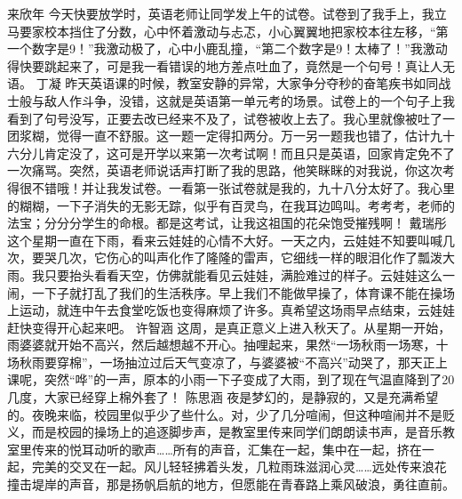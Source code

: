 {}\markdownRendererInterblockSeparator
{}来欣年\markdownRendererInterblockSeparator
{}今天快要放学时，英语老师让同学发上午的试卷。试卷到了我手上，我立马要家校本挡住了分数，心中怀着激动与忐忑，小心翼翼地把家校本往左移，“第一个数字是9！”我激动极了，心中小鹿乱撞，“第二个数字是9！太棒了！”我激动得快要跳起来了，可是我一看错误的地方差点吐血了，竟然是一个句号！真让人无语。\markdownRendererInterblockSeparator
{}\markdownRendererInterblockSeparator
{}丁凝\markdownRendererInterblockSeparator
{}昨天英语课的时候，教室安静的异常，大家争分夺秒的奋笔疾书如同战士般与敌人作斗争，没错，这就是英语第一单元考的场景。试卷上的一个句子上我看到了句号没写，正要去改已经来不及了，试卷被收上去了。我心里就像被吐了一团浆糊，觉得一直不舒服。这一题一定得扣两分。万一另一题我也错了，估计九十六分儿肯定没了，这可是开学以来第一次考试啊！而且只是英语，回家肯定免不了一次痛骂。突然，英语老师说话声打断了我的思路，他笑眯眯的对我说，你这次考得很不错哦！并让我发试卷。一看第一张试卷就是我的，九十八分太好了。我心里的糊糊，一下子消失的无影无踪，似乎有百灵鸟，在我耳边鸣叫。考考考，老师的法宝；分分分学生的命根。都是这考试，让我这祖国的花朵饱受摧残啊！\markdownRendererInterblockSeparator
{}\markdownRendererInterblockSeparator
{}戴瑞彤\markdownRendererInterblockSeparator
{}这个星期一直在下雨，看来云娃娃的心情不大好。一天之内，云娃娃不知要叫喊几次，要哭几次，它伤心的叫声化作了隆隆的雷声，它细线一样的眼泪化作了瓢泼大雨。我只要抬头看看天空，仿佛就能看见云娃娃，满脸难过的样子。云娃娃这么一闹，一下子就打乱了我们的生活秩序。早上我们不能做早操了，体育课不能在操场上运动，就连中午去食堂吃饭也变得麻烦了许多。真希望这场雨早点结束，云娃娃赶快变得开心起来吧。\markdownRendererInterblockSeparator
{}\markdownRendererInterblockSeparator
{}许智涵\markdownRendererInterblockSeparator
{}这周，是真正意义上进入秋天了。从星期一开始，雨婆婆就开始不高兴，然后越想越不开心。抽哩起来，果然“一场秋雨一场寒，十场秋雨要穿棉”，一场抽泣过后天气变凉了，与婆婆被“不高兴”动哭了，那天正上课呢，突然“哗”的一声，原本的小雨一下子变成了大雨，到了现在气温直降到了20几度，大家已经穿上棉外套了！\markdownRendererInterblockSeparator
{}\markdownRendererInterblockSeparator
{}陈思涵\markdownRendererInterblockSeparator
{}夜是梦幻的，是静寂的，又是充满希望的。夜晚来临，校园里似乎少了些什么。对，少了几分喧闹，但这种喧闹并不是贬义，而是校园的操场上的追逐脚步声，是教室里传来同学们朗朗读书声，是音乐教室里传来的悦耳动听的歌声……所有的声音，汇集在一起，集中在一起，挤在一起，完美的交叉在一起。风儿轻轻拂着头发，几粒雨珠滋润心灵……远处传来浪花撞击堤岸的声音，那是扬帆启航的地方，但愿能在青春路上乘风破浪，勇往直前。 \markdownRendererInterblockSeparator
